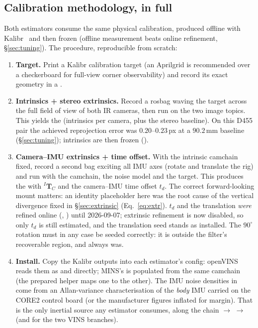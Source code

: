 \subsection{Calibration methodology, in full}
\label{ap:repro-calib}
Both estimators consume the same physical calibration, produced offline with
Kalibr~\cite{furgale2013kalibr} and then frozen (offline measurement beats
online refinement, \S\ref{sec:tuning}). The procedure, reproducible from
scratch:

\begin{enumerate}[leftmargin=1.4em]
\item \textbf{Target.} Print a Kalibr calibration target (an Aprilgrid is
  recommended over a checkerboard for full-view corner observability) and
  record its exact geometry in a .
\item \textbf{Intrinsics + stereo extrinsics.} Record a rosbag waving the
  target across the full field of view of both IR cameras, then run
   on the two image topics. This yields the
   (intrinsics per camera, plus the stereo baseline).
  On this D455 pair the achieved reprojection error was $0.20$--$0.23$\,px at
  a $90.2$\,mm baseline (\S\ref{sec:tuning}); intrinsics are then frozen
  ().
\item \textbf{Camera--IMU extrinsics + time offset.} With the intrinsic
  camchain fixed, record a second bag exciting all IMU axes (rotate and
  translate the rig) and run  with the
  camchain, the  noise model and the target. This produces the
   with $^{I}\mathbf{T}_{C}$ and the
  camera--IMU time offset $t_d$. The correct forward-looking mount matters:
  an identity placeholder here was the root cause of the vertical divergence
  fixed in \S\ref{sec:extrinsic} (Eq.~\ref{eq:extr}). $t_d$ and the
  translation \emph{were} refined online (,
  ) until 2026-09-07; extrinsic refinement is now
  disabled, so only $t_d$ is still estimated, and the translation seed stands
  as installed. The $90^\circ$ rotation must in any case be seeded correctly:
  it is outside the filter's recoverable region, and always was.
\item \textbf{Install.} Copy the Kalibr outputs into each estimator's config:
  openVINS reads them as  and
   directly; MINS's 
  is populated from the same camchain (the prepared
   helper maps one to the other). The IMU noise
  densities in  come from an Allan-variance
  characterisation of the \emph{body} IMU carried on the CORE2 control board
  (or the manufacturer figures inflated for margin). That is the only
  inertial source any estimator consumes, along the chain
   $\rightarrow$  $\rightarrow$
   (and  for the two VINS
  branches).


\end{enumerate}
